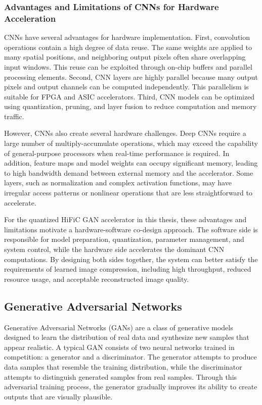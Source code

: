 \subsubsection{Advantages and Limitations of CNNs for Hardware Acceleration}

CNNs have several advantages for hardware implementation. First, convolution operations contain a high degree of data reuse. The same weights are applied to many spatial positions, and neighboring output pixels often share overlapping input windows. This reuse can be exploited through on-chip buffers and parallel processing elements. Second, CNN layers are highly parallel because many output pixels and output channels can be computed independently. This parallelism is suitable for FPGA and ASIC accelerators. Third, CNN models can be optimized using quantization, pruning, and layer fusion to reduce computation and memory traffic.

However, CNNs also create several hardware challenges. Deep CNNs require a large number of multiply-accumulate operations, which may exceed the capability of general-purpose processors when real-time performance is required. In addition, feature maps and model weights can occupy significant memory, leading to high bandwidth demand between external memory and the accelerator. Some layers, such as normalization and complex activation functions, may have irregular access patterns or nonlinear operations that are less straightforward to accelerate.

For the quantized HiFiC GAN accelerator in this thesis, these advantages and limitations motivate a hardware-software co-design approach. The software side is responsible for model preparation, quantization, parameter management, and system control, while the hardware side accelerates the dominant CNN computations. By designing both sides together, the system can better satisfy the requirements of learned image compression, including high throughput, reduced resource usage, and acceptable reconstructed image quality.

\subsection{Generative Adversarial Networks}

Generative Adversarial Networks (GANs) are a class of generative models designed to learn the distribution of real data and synthesize new samples that appear realistic. A typical GAN consists of two neural networks trained in competition: a generator and a discriminator. The generator attempts to produce data samples that resemble the training distribution, while the discriminator attempts to distinguish generated samples from real samples. Through this adversarial training process, the generator gradually improves its ability to create outputs that are visually plausible. \cite{goodfellow2014gan}

